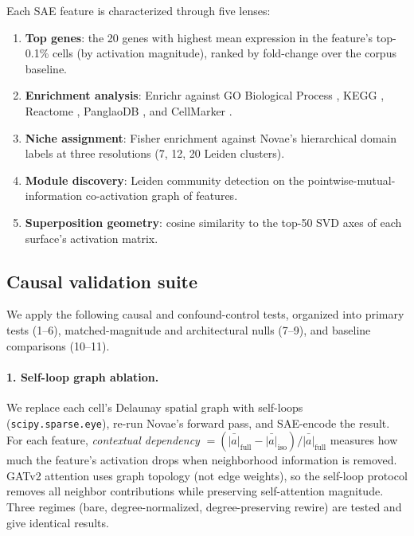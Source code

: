\documentclass[11pt]{article}
\begin{document}
Each SAE feature is characterized through five lenses:
\begin{enumerate}
\item \textbf{Top genes}: the 20 genes with highest mean expression
      in the feature's top-0.1\% cells (by activation magnitude),
      ranked by fold-change over the corpus baseline.
\item \textbf{Enrichment analysis}: Enrichr \citep{enrichr}
      against GO Biological Process \citep{go2021}, KEGG \citep{kegg2000},
      Reactome \citep{reactome2020}, PanglaoDB \citep{panglao}, and
      CellMarker \citep{cellmarker2019}.
\item \textbf{Niche assignment}: Fisher enrichment against Novae's
      hierarchical domain labels at three resolutions (7, 12, 20
      Leiden \citep{leiden} clusters).
\item \textbf{Module discovery}: Leiden community detection on the
      pointwise-mutual-information co-activation graph of features.
\item \textbf{Superposition geometry}: cosine similarity to the
      top-50 SVD axes of each surface's activation matrix.
\end{enumerate}

\subsection{Causal validation suite}
\label{sec:methods_validation}

We apply the following causal and confound-control tests, organized
into primary tests (1--6), matched-magnitude and architectural nulls
(7--9), and baseline comparisons (10--11).

\paragraph{1. Self-loop graph ablation.}
We replace each cell's Delaunay spatial graph with self-loops
(\texttt{scipy.sparse.eye}), re-run Novae's forward pass, and
SAE-encode the result. For each feature, \emph{contextual dependency}
$= (\bar{|a|}_\text{full} - \bar{|a|}_\text{iso}) / \bar{|a|}_\text{full}$
measures how much the feature's activation drops when neighborhood
information is removed. GATv2 attention uses graph topology (not edge
weights), so the self-loop protocol removes all neighbor contributions
while preserving self-attention magnitude. Three regimes (bare,
degree-normalized, degree-preserving rewire) are tested and give
identical results.
\end{document}
